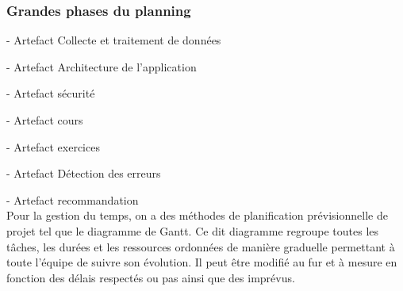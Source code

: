 \subsubsection{Grandes phases du planning}
	- Artefact Collecte et traitement de données 

\noindent

	- Artefact Architecture de l’application
\noindent

	- Artefact sécurité
\noindent

	- Artefact cours
\noindent

	- Artefact exercices 
\noindent

	- Artefact Détection des erreurs 
\noindent

	- Artefact recommandation \\
	Pour la gestion du temps, on a des méthodes de planification prévisionnelle de projet tel que le diagramme de Gantt. Ce dit diagramme regroupe toutes les tâches, les durées et les ressources ordonnées de manière graduelle permettant à toute l’équipe de suivre son évolution. Il peut être modifié au fur et à mesure en fonction des délais respectés ou pas ainsi que des imprévus. 

